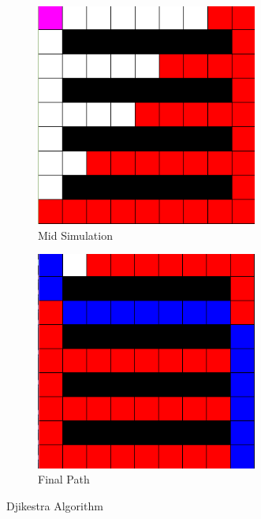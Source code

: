 \documentclass[twocolumn]{article}
\begin{document}
\begin{figure}[H]
    \centering
    \begin{subfigure}{0.235\textwidth}
        \centering
        \includegraphics[width=0.8\textwidth]{figures/2024-05-22_22-44_1.png}
        \caption{Mid Simulation}
    \end{subfigure}
    \hfill
    \begin{subfigure}{0.235\textwidth}
        \centering
          \includegraphics[width=0.8\textwidth]{figures/2024-05-22_22-44.png}
        \caption{Final Path}
    \end{subfigure}
    \caption{Djikestra Algorithm}
    \label{fig:test2}
\end{figure}
\end{document}
